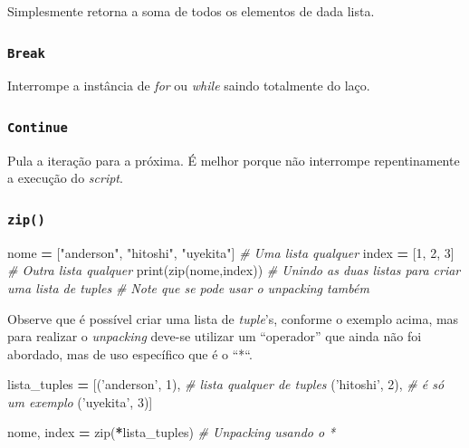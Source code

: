 \documentclass[]{book}
\newenvironment{Shaded}{\begin{snugshade}}{\end{snugshade}}
\newcommand{\DecValTok}[1]{\textcolor[rgb]{0.00,0.00,0.81}{#1}}
\newcommand{\StringTok}[1]{\textcolor[rgb]{0.31,0.60,0.02}{#1}}
\newcommand{\CommentTok}[1]{\textcolor[rgb]{0.56,0.35,0.01}{\textit{#1}}}
\newcommand{\OperatorTok}[1]{\textcolor[rgb]{0.81,0.36,0.00}{\textbf{#1}}}
\newcommand{\BuiltInTok}[1]{#1}
\newcommand{\NormalTok}[1]{#1}
\begin{document}
Simplesmente retorna a soma de todos os elementos de dada lista.

\subsubsection{\texorpdfstring{\texttt{Break}}{Break}}\label{break}

Interrompe a instância de \emph{for} ou \emph{while} saindo totalmente
do laço.

\subsubsection{\texorpdfstring{\texttt{Continue}}{Continue}}\label{continue}

Pula a iteração para a próxima. É melhor porque não interrompe
repentinamente a execução do \emph{script}.

\subsubsection{\texorpdfstring{\texttt{zip()}}{zip()}}\label{zip}

\begin{Shaded}
\begin{Highlighting}[]
\NormalTok{nome }\OperatorTok{=}\NormalTok{ [}\StringTok{"anderson"}\NormalTok{, }\StringTok{"hitoshi"}\NormalTok{, }\StringTok{"uyekita"}\NormalTok{] }\CommentTok{# Uma lista qualquer}
\NormalTok{index }\OperatorTok{=}\NormalTok{ [}\DecValTok{1}\NormalTok{, }\DecValTok{2}\NormalTok{, }\DecValTok{3}\NormalTok{]                         }\CommentTok{# Outra lista qualquer}
\BuiltInTok{print}\NormalTok{(}\BuiltInTok{zip}\NormalTok{(nome,index))                    }\CommentTok{# Unindo as duas listas para criar uma lista de tuples}
                                          \CommentTok{# Note que se pode usar o unpacking também}
\end{Highlighting}
\end{Shaded}

Observe que é possível criar uma lista de \emph{tuple}'s, conforme o
exemplo acima, mas para realizar o \emph{unpacking} deve-se utilizar um
``operador'' que ainda não foi abordado, mas de uso específico que é o
``*``.

\begin{Shaded}
\begin{Highlighting}[]
\NormalTok{lista_tuples }\OperatorTok{=}\NormalTok{ [(}\StringTok{'anderson'}\NormalTok{, }\DecValTok{1}\NormalTok{), }\CommentTok{# lista qualquer de tuples}
\NormalTok{                (}\StringTok{'hitoshi'}\NormalTok{, }\DecValTok{2}\NormalTok{),  }\CommentTok{# é só um exemplo}
\NormalTok{                (}\StringTok{'uyekita'}\NormalTok{, }\DecValTok{3}\NormalTok{)]}

\NormalTok{nome, index }\OperatorTok{=} \BuiltInTok{zip}\NormalTok{(}\OperatorTok{*}\NormalTok{lista_tuples) }\CommentTok{# Unpacking usando o *}
\end{Highlighting}
\end{Shaded}
\end{document}
